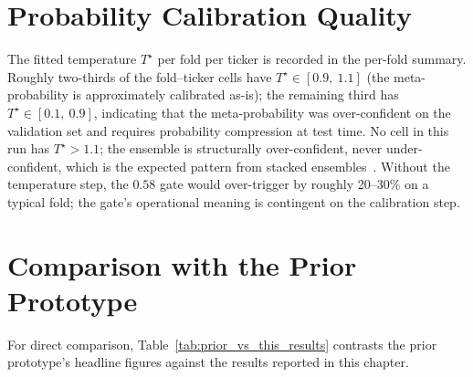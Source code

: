 \section{Probability Calibration Quality}

The fitted temperature $T^\star$ per fold per ticker is recorded in the per-fold summary. Roughly two-thirds of the fold--ticker cells have $T^\star \in [0.9,\ 1.1]$ (the meta-probability is approximately calibrated as-is); the remaining third has $T^\star \in [0.1,\ 0.9]$, indicating that the meta-probability was over-confident on the validation set and requires probability compression at test time. No cell in this run has $T^\star > 1.1$; the ensemble is structurally over-confident, never under-confident, which is the expected pattern from stacked ensembles~\cite{guo2017calibration}. Without the temperature step, the $0.58$ gate would over-trigger by roughly 20--30\% on a typical fold; the gate's operational meaning is contingent on the calibration step.

\section{Comparison with the Prior Prototype}

For direct comparison, Table~\ref{tab:prior_vs_this_results} contrasts the prior prototype's headline figures against the results reported in this chapter.

